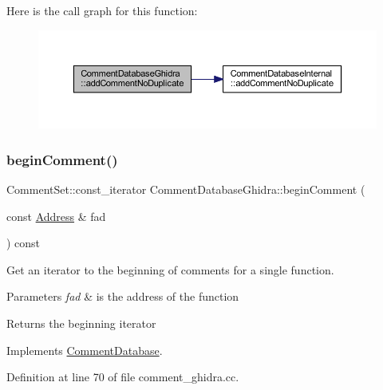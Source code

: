 Here is the call graph for this function\+:
\nopagebreak
\begin{figure}[H]
\begin{center}
\leavevmode
\includegraphics[width=350pt]{class_comment_database_ghidra_a39ad32e0b6abb1ee32c96780ac9b446c_cgraph}
\end{center}
\end{figure}
\mbox{\label{class_comment_database_ghidra_a3fc25277281f61f2aa851b4bbb1e33f1}} 
\subsubsection{\texorpdfstring{beginComment()}{beginComment()}}
{\footnotesize\ttfamily Comment\+Set\+::const\+\_\+iterator Comment\+Database\+Ghidra\+::begin\+Comment (\begin{DoxyParamCaption}\item[{const \mbox{\hyperlink{class_address}{Address}} \&}]{fad }\end{DoxyParamCaption}) const\hspace{0.3cm}{\ttfamily [virtual]}}



Get an iterator to the beginning of comments for a single function. 


\begin{DoxyParams}{Parameters}
{\em fad} & is the address of the function \\
\hline
\end{DoxyParams}
\begin{DoxyReturn}{Returns}
the beginning iterator 
\end{DoxyReturn}


Implements \mbox{\hyperlink{class_comment_database_a4eb1eb37180fc092244b37ea11f7f2a4}{Comment\+Database}}.



Definition at line 70 of file comment\+\_\+ghidra.\+cc.

